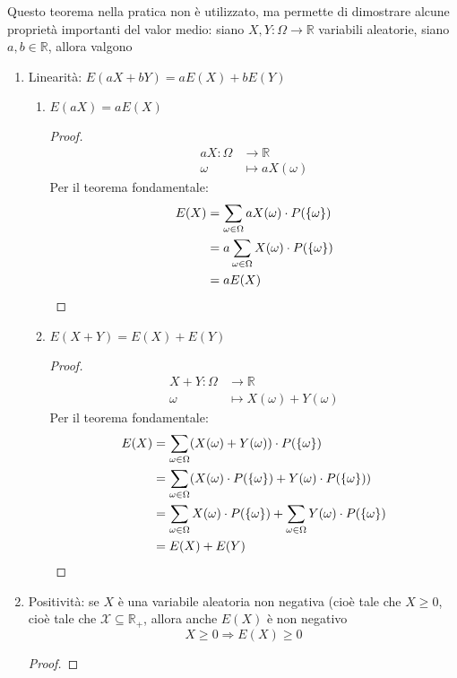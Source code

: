 \documentclass{article}
\theoremstyle{plain}
\theoremstyle{definition}
\theoremstyle{remark}
\begin{document}
Questo teorema nella pratica non è utilizzato, ma permette di dimostrare alcune proprietà importanti del valor medio: siano $X,Y:\Omega\to\mathds{R}$ variabili aleatorie, siano $a,b\in\mathds{R}$, allora valgono
\begin{enumerate}
	\item Linearità: $E(aX+bY)=aE(X)+bE(Y)$
	\begin{enumerate}
		\item $E(aX)=aE(X)$
		\begin{proof}
			\begin{align*}
				aX:\Omega&\to\mathds{R}\\
				\omega&\mapsto aX(\omega)
			\end{align*}
			Per il teorema fondamentale:
			\begin{align*}
				E(X)&=\sum_{\omega\in\Omega} aX(\omega)\cdot P(\{\omega\})\\
				&=a\sum_{\omega\in\Omega} X(\omega)\cdot P(\{\omega\})\\
				&=aE(X)\qedhere
			\end{align*}
		\end{proof}
		\item $E(X+Y)=E(X)+E(Y)$
		\begin{proof}
			\begin{align*}
				X+Y:\Omega&\to\mathds{R}\\
				\omega&\mapsto X(\omega)+Y(\omega)
			\end{align*}
			Per il teorema fondamentale:
			\begin{align*}
				E(X)&=\sum_{\omega\in\Omega} (X(\omega)+Y(\omega))\cdot P(\{\omega\})\\
				&=\sum_{\omega\in\Omega} (X(\omega)\cdot P(\{\omega\})+Y(\omega)\cdot P(\{\omega\}))\\
				&=\sum_{\omega\in\Omega} X(\omega)\cdot P(\{\omega\})+\sum_{\omega\in\Omega} Y(\omega)\cdot P(\{\omega\})\\
				&=E(X)+E(Y)\qedhere
			\end{align*}
		\end{proof}
	\end{enumerate}
	\item Positività: se $X$ è una variabile aleatoria non negativa (cioè tale che $X\geq0$, cioè tale che $\mathcal{X}\subseteq\mathds{R}_+$, allora anche $E(X)$ è non negativo
	\begin{equation*}
		X\geq0\Rightarrow E(X)\geq0
	\end{equation*}
	\begin{proof}

\end{proof}
\end{enumerate}
\end{document}
